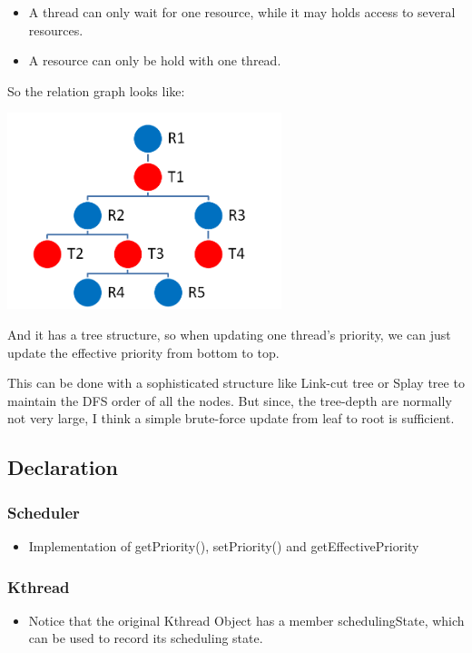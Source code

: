 \documentclass{article}
\begin{document}
	\begin{itemize}
	\item A thread can only wait for one resource, while it may holds access to several resources.
	
	\item A resource can only be hold with one thread.
	\end{itemize}
	
	So the relation graph looks like:
	
	\includegraphics[width=8cm]{structure.png}
	
	And it has a tree structure, so when updating one thread's priority, we can just update the effective priority from bottom to top.
	
	This can be done with a sophisticated structure like Link-cut tree or Splay tree to maintain the DFS order of all the nodes. But since, the tree-depth are normally not very large, I think a simple brute-force update from leaf to root is sufficient.
	
	\subsection{Declaration}
	\subsubsection{Scheduler}
	
	\begin{itemize}
		\item Implementation of getPriority(), setPriority() and getEffectivePriority
	\end{itemize}
	
	\subsubsection{Kthread}
	
	\begin{itemize}
		\item Notice that the original Kthread Object has a member schedulingState, which can be used to record its scheduling state.
	\end{itemize}
\end{document}
